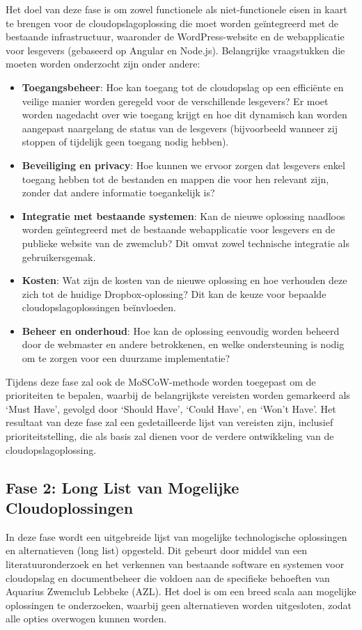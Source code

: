 Het doel van deze fase is om zowel functionele als niet-functionele eisen in kaart te brengen voor de cloudopslagoplossing die moet worden geïntegreerd met de bestaande infrastructuur, waaronder de WordPress-website en de webapplicatie voor lesgevers (gebaseerd op Angular en Node.js). Belangrijke vraagstukken die moeten worden onderzocht zijn onder andere:
\begin{itemize}
    \item \textbf{Toegangsbeheer}: Hoe kan toegang tot de cloudopslag op een efficiënte en veilige manier worden geregeld voor de verschillende lesgevers? Er moet worden nagedacht over wie toegang krijgt en hoe dit dynamisch kan worden aangepast naargelang de status van de lesgevers (bijvoorbeeld wanneer zij stoppen of tijdelijk geen toegang nodig hebben).
    \item \textbf{Beveiliging en privacy}: Hoe kunnen we ervoor zorgen dat lesgevers enkel toegang hebben tot de bestanden en mappen die voor hen relevant zijn, zonder dat andere informatie toegankelijk is?
    \item \textbf{Integratie met bestaande systemen}: Kan de nieuwe oplossing naadloos worden geïntegreerd met de bestaande webapplicatie voor lesgevers en de publieke website van de zwemclub? Dit omvat zowel technische integratie als gebruikersgemak.
    \item \textbf{Kosten}: Wat zijn de kosten van de nieuwe oplossing en hoe verhouden deze zich tot de huidige Dropbox-oplossing? Dit kan de keuze voor bepaalde cloudopslagoplossingen beïnvloeden.
    \item \textbf{Beheer en onderhoud}: Hoe kan de oplossing eenvoudig worden beheerd door de webmaster en andere betrokkenen, en welke ondersteuning is nodig om te zorgen voor een duurzame implementatie?
\end{itemize}

Tijdens deze fase zal ook de MoSCoW-methode worden toegepast om de prioriteiten te bepalen, waarbij de belangrijkste vereisten worden gemarkeerd als ‘Must Have’, gevolgd door ‘Should Have’, ‘Could Have’, en ‘Won’t Have’. Het resultaat van deze fase zal een gedetailleerde lijst van vereisten zijn, inclusief prioriteitstelling, die als basis zal dienen voor de verdere ontwikkeling van de cloudopslagoplossing.

\subsection{Fase 2: Long List van Mogelijke Cloudoplossingen}
In deze fase wordt een uitgebreide lijst van mogelijke technologische oplossingen en alternatieven (long list) opgesteld. Dit gebeurt door middel van een literatuuronderzoek en het verkennen van bestaande software en systemen voor cloudopslag en documentbeheer die voldoen aan de specifieke behoeften van Aquarius Zwemclub Lebbeke (AZL). Het doel is om een breed scala aan mogelijke oplossingen te onderzoeken, waarbij geen alternatieven worden uitgesloten, zodat alle opties overwogen kunnen worden.


